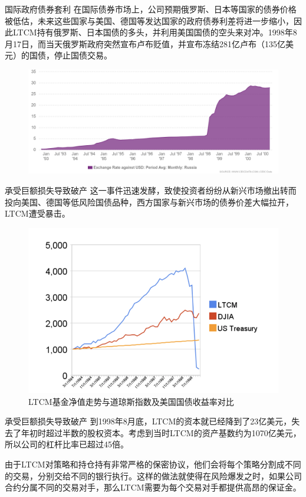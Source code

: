 \begin{frame}{国际政府债券套利}
    在国际债券市场上，公司预期俄罗斯、日本等国家的债券价格被低估，未来这些国家与美国、德国等发达国家的政府债券利差将进一步缩小，因此LTCM持有俄罗斯、日本国债的多头，并利用美国国债的空头来对冲。1998年8月17日，而当天俄罗斯政府突然宣布卢布贬值，并宣布冻结281亿卢布（135亿美元）的国债，停止国债交易。
    \begin{figure}
        \centering
        \includegraphics[width=\linewidth]{img/rub_usd.png}
    \end{figure}
\end{frame}

\begin{frame}{承受巨额损失导致破产}
    这一事件迅速发酵，致使投资者纷纷从新兴市场撤出转而投向美国、德国等低风险国债品种，西方国家与新兴市场的债券价差大幅拉开，LTCM遭受暴击。
    \begin{figure}[H]
        \centering
        \includegraphics[width=0.8\linewidth]{img/图片 1.png}
        \caption{LTCM基金净值走势与道琼斯指数及美国国债收益率对比}
    \end{figure}
\end{frame}
\begin{frame}{承受巨额损失导致破产}
    到1998年8月底，LTCM的资本就已经降到了23亿美元，失去了年初时超过半数的股权资本。考虑到当时LTCM的资产基数约为1070亿美元，所以公司的杠杆比率已超过45倍。
    
    由于LTCM对策略和持仓持有非常严格的保密协议，他们会将每个策略分割成不同的交易，分别交给不同的银行执行。这样的做法就使得在风险爆发之时，如果公司合约分属不同的交易对手，那么LTCM需要为每个交易对手都提供高昂的保证金。
\end{frame}
